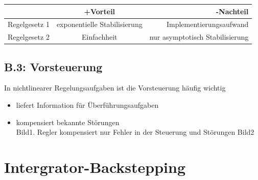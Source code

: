\documentclass[ngerman]{tudscrreprt}
\begin{document}
\begin{center}
  \begin{tabular}{ l | c | r }
     & +Vorteil & -Nachteil \\ \hline
    Regelgesetz 1 & exponentielle Stabilisierung & Implementierungsaufwand \\ \hline
   Regelgesetz 2 & Einfachheit & nur asymptotisch Stabilisierung \\
    \hline
  \end{tabular}
\end{center}
\section*{\textbf{B.3: } Vorsteuerung}
In nichtlinearer Regelungsaufgaben ist die Vorsteuerung häufig wichtig
\begin{itemize}
\item liefert Information für Überführungsaufgaben
\item kompensiert bekannte Störungen\\
Bild1. Regler kompensiert nur Fehler in der Steuerung und Störungen Bild2
\end{itemize}
\chapter{Intergrator-Backstepping}
\end{document}
